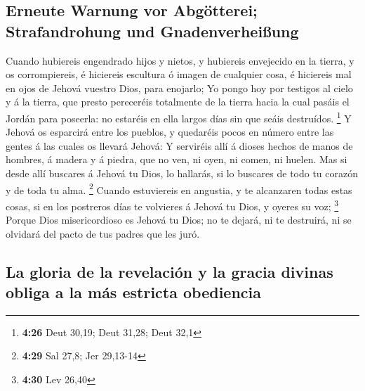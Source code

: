 \hypertarget{erneute-warnung-vor-abguxf6tterei-strafandrohung-und-gnadenverheiuxdfung}{%
\subsection{Erneute Warnung vor Abgötterei; Strafandrohung und
Gnadenverheißung}\label{erneute-warnung-vor-abguxf6tterei-strafandrohung-und-gnadenverheiuxdfung}}

 Cuando hubiereis engendrado hijos y nietos, y hubiereis
envejecido en la tierra, y os corrompiereis, é hiciereis escultura ó
imagen de cualquier cosa, é hiciereis mal en ojos de Jehová vuestro
Dios, para enojarlo;  Yo pongo hoy por testigos al cielo
y á la tierra, que presto pereceréis totalmente de la tierra hacia la
cual pasáis el Jordán para poseerla: no estaréis en ella largos días sin
que seáis destruídos. \footnote{\textbf{4:26} Deut 30,19; Deut 31,28;
  Deut 32,1}  Y Jehová os esparcirá entre los pueblos, y
quedaréis pocos en número entre las gentes á las cuales os llevará
Jehová:  Y serviréis allí á dioses hechos de manos de
hombres, á madera y á piedra, que no ven, ni oyen, ni comen, ni huelen.
 Mas si desde allí buscares á Jehová tu Dios, lo
hallarás, si lo buscares de todo tu corazón y de toda tu alma.
\footnote{\textbf{4:29} Sal 27,8; Jer 29,13-14}  Cuando
estuviereis en angustia, y te alcanzaren todas estas cosas, si en los
postreros días te volvieres á Jehová tu Dios, y oyeres su voz;
\footnote{\textbf{4:30} Lev 26,40}  Porque Dios
misericordioso es Jehová tu Dios; no te dejará, ni te destruirá, ni se
olvidará del pacto de tus padres que les juró.

\hypertarget{la-gloria-de-la-revelaciuxf3n-y-la-gracia-divinas-obliga-a-la-muxe1s-estricta-obediencia}{%
\subsection{La gloria de la revelación y la gracia divinas obliga a la
más estricta
obediencia}\label{la-gloria-de-la-revelaciuxf3n-y-la-gracia-divinas-obliga-a-la-muxe1s-estricta-obediencia}}

